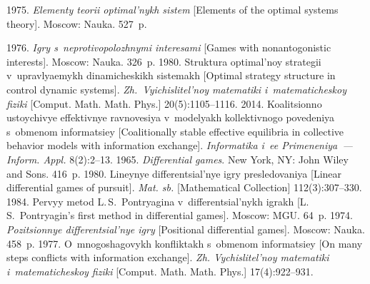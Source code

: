 







  \begin{multicols}{2}

\renewcommand{\bibname}{\protect\rmfamily References}

{\small\frenchspacing
 {%
 \begin{thebibliography}{99}
    

 1975. \textit{Elementy teorii optimal'nykh sistem} [Elements of 
the optimal systems theory]. Moscow: Nauka. 527~p.

 1976. \textit{Igry s~neprotivopolozhnymi interesami} 
[Games with nonantogonistic interests]. Moscow: Nauka. 326~p.
 1980. Struktura optimal'noy strategii v~upravlyaemykh 
dinamicheskikh sistemakh [Optimal strategy structure in control dynamic systems].  
\textit{Zh.~Vyichislitel'noy matematiki i~matematicheskoy fiziki} [Comput. Math. 
Math. Phys.] 20(5):1105--1116. 
 2014. Koalitsionno ustoychivye effektivnye ravnovesiya 
v~modelyakh kollektivnogo povedeniya s~obmenom informatsiey [Coalitionally stable 
effective equilibria in collective behavior models with information exchange].  
\textit{Informatika i~ee Primeneniya~--- Inform. Appl.} 8(2):2--13. 
 1965. \textit{Differential games}. New York, NY: 
John Wiley and Sons. 416~p.
 1980. Lineynye differentsial'nye igry presledovaniya [Linear 
differential games of pursuit]. \textit{Mat. sb.} [Mathematical Collection] 
112(3):307--330.
 1984. Pervyy metod L.\,S.~Pontryagina v~differentsial'nykh 
igrakh [L.\,S.~Pontryagin's first method in differential games]. Moscow: MGU. 64~p. 
 1974. \textit{Pozitsionnye 
differentsial'nye igry} [Positional differential games]. Moscow: Nauka. 458~p.
 1977. O~mnogoshagovykh konfliktakh s~obmenom 
informatsiey [On many steps conflicts with information exchange]. \textit{Zh. 
Vychislitel'noy matematiki i~matematicheskoy fiziki} [Comput. Math. Math. Phys.] 
17(4):922--931.


\end{thebibliography}}}
\end{multicols}
